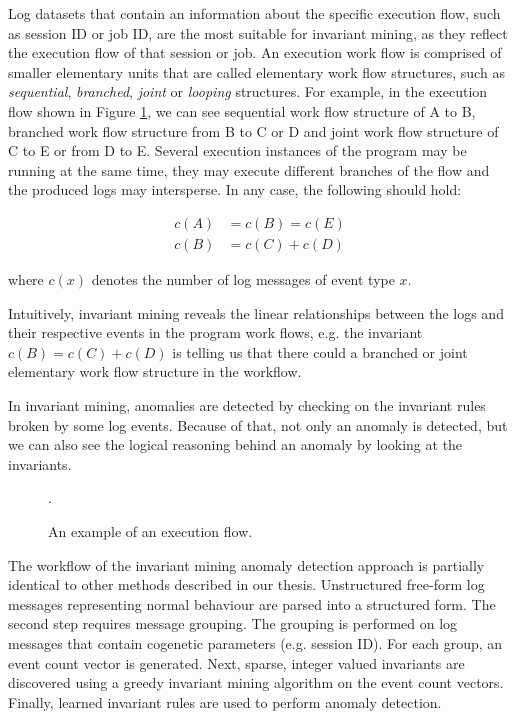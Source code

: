 Log datasets that contain an information about the specific execution flow, such as session ID or job ID, are the most suitable for invariant mining, as they reflect the execution flow of that session or job. An execution work flow is comprised of smaller elementary units that are called elementary work flow structures, such as \textit{sequential}, \textit{branched}, \textit{joint} or \textit{looping} structures. For example, in the execution flow shown in Figure \ref{figure:invariantMiningExecutionFlow}, we can see sequential work flow structure of A to B, branched work flow structure from B to C or D and joint work flow structure of C to E or from D to E. Several execution instances of the program may be running at the same time, they may execute different branches of the flow and the produced logs may intersperse. In any case, the following should hold:

\begin{align}
    c(A) &= c(B) = c(E) \\
    c(B) &= c(C) + c(D)
\end{align}

where $c(x)$ denotes the number of log messages of event type $x$. 

Intuitively, invariant mining reveals the linear relationships between the logs and their respective events in the program work flows, e.g. the invariant $c(B) = c(C) + c(D)$ is telling us that there could a branched or joint elementary work flow structure in the workflow. 

In invariant mining, anomalies are detected by checking on the invariant rules broken by some log events. Because of that, not only an anomaly is detected, but we can also see the logical reasoning behind an anomaly by looking at the invariants.  

\begin{figure}\centering
	
	\caption{An example of an execution flow.}.
	\label{figure:invariantMiningExecutionFlow}
\end{figure}

The workflow of the invariant mining anomaly detection approach is partially identical to other methods described in our thesis. Unstructured free-form log messages representing normal behaviour are parsed into a structured form. The second step requires message grouping. The grouping is performed on log messages that contain cogenetic parameters (e.g. session ID). For each group, an event count vector is generated. Next, sparse, integer valued invariants are discovered using a greedy invariant mining algorithm on the event count vectors. Finally, learned invariant rules are used to perform anomaly detection.

